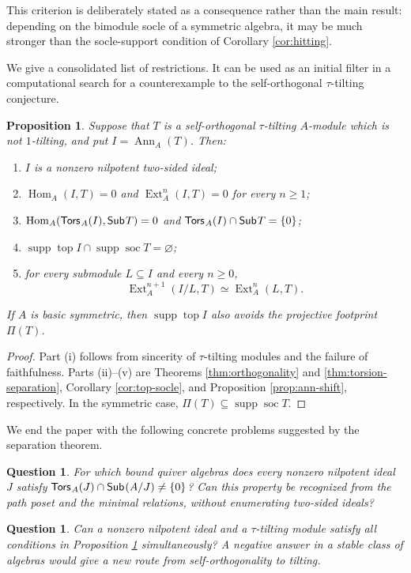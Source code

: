 \documentclass[a4paper,reqno]{amsart}
\newtheorem{proposition}[theorem]{Proposition}
\newtheorem{question}[theorem]{Question}
\theoremstyle{definition}
\newcommand{\Ext}{\operatorname{Ext}\nolimits}
\newcommand{\Hom}{\operatorname{Hom}\nolimits}
\newcommand{\Ann}{\operatorname{Ann}\nolimits}
\newcommand{\soc}{\operatorname{soc}\nolimits}
\newcommand{\topm}{\operatorname{top}\nolimits}
\newcommand{\supp}{\operatorname{supp}\nolimits}
\newcommand{\Sub}{\mathsf{Sub}\hspace{.01in}}
\newcommand{\Tors}{\mathsf{Tors}\hspace{.01in}}
\numberwithin{equation}{section}
\begin{document}
This criterion is deliberately stated as a
consequence rather than the main result: depending on the bimodule
socle of a symmetric algebra, it may be much stronger than the
socle-support condition of Corollary \ref{cor:hitting}.

We give a consolidated list of restrictions. It can be used
as an initial filter in a computational search for a counterexample
to the self-orthogonal $\tau$-tilting conjecture.

\begin{proposition}
\label{prop:counterexample-profile}
Suppose that $T$ is a self-orthogonal $\tau$-tilting $A$-module which
is not $1$-tilting, and put $I=\Ann_A(T)$. Then:
\begin{enumerate}[\rm(i)]
\item $I$ is a nonzero nilpotent two-sided ideal;
\item $\Hom_A(I,T)=0$ and $\Ext_A^n(I,T)=0$ for every $n\geq1$;
\item $\Hom_A(\Tors_A(I),\Sub T)=0$ and
      $\Tors_A(I)\cap\Sub T=\{0\}$;
\item $\supp\topm I\cap\supp\soc T=\varnothing$;
\item for every submodule $L\subseteq I$ and every $n\geq0$,
\[
          \Ext_A^{n+1}(I/L,T)\simeq\Ext_A^n(L,T).
\]
\end{enumerate}
If $A$ is basic symmetric, then $\supp\topm I$ also avoids the
projective footprint $\Pi(T)$.
\end{proposition}

\begin{proof}
Part (i) follows from sincerity of $\tau$-tilting modules and the
failure of faithfulness.  Parts (ii)--(v) are Theorems
\ref{thm:orthogonality} and \ref{thm:torsion-separation}, Corollary
\ref{cor:top-socle}, and Proposition \ref{prop:ann-shift},
respectively. In the symmetric case,
$\Pi(T)\subseteq\supp\soc T$.
\end{proof}


We end the paper with the following concrete problems suggested by the separation theorem.

\begin{question}
For which bound quiver algebras does every nonzero nilpotent ideal
$J$ satisfy
$\Tors_A(J)\cap\Sub(A/J)\neq\{0\}$? Can this property be recognized
from the path poset and the minimal relations, without enumerating
two-sided ideals?
\end{question}

\begin{question}
Can a nonzero nilpotent ideal and a $\tau$-tilting module satisfy all
conditions in Proposition \ref{prop:counterexample-profile}
simultaneously? A negative answer in a stable class of algebras would
give a new route from self-orthogonality to tilting.
\end{question}
\end{document}
